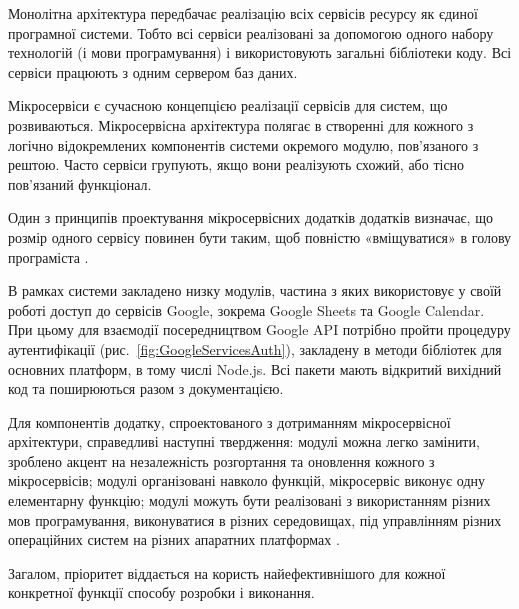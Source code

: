 \label{subsec:microservices}

Монолітна архітектура передбачає реалізацію всіх сервісів ресурсу як єдиної програмної системи. Тобто всі сервіси реалізовані за допомогою одного набору технологій (і мови програмування) і використовують загальні бібліотеки коду. Всі сервіси працюють з одним сервером баз даних.

Мікросервіси є сучасною концепцією реалізації сервісів для систем, що розвиваються. Мікросервісна архітектура полягає в створенні для кожного з логічно відокремлених компонентів системи окремого модулю, пов'язаного з рештою. Часто сервіси групують, якщо вони реалізують схожий, або тісно пов'язаний функціонал.  

Один з принципів проектування мікросервісних додатків додатків визначає, що розмір одного сервісу повинен бути таким, щоб повністю «вміщуватися» в голову програміста \cite{приходченко2018обґрунтування}.

В рамках системи закладено низку модулів, частина з яких використовує у своїй роботі доступ до сервісів Google, зокрема Google Sheets та Google Calendar. При цьому для взаємодії посередництвом Google API потрібно пройти процедуру аутентифікації (рис.~\ref{fig:GoogleServicesAuth}), закладену в методи бібліотек для основних платформ, в тому числі Node.js. Всі пакети мають відкритий вихідний код та поширюються разом з документацією.


Для компонентів додатку, спроектованого з дотриманням мікросервісної архітектури, справедливі наступні твердження: модулі можна легко замінити, зроблено акцент на незалежність розгортання та оновлення кожного з мікросервісів; модулі організовані навколо функцій, мікросервіс виконує одну елементарну функцію; модулі можуть бути реалізовані з використанням різних мов програмування, виконуватися в різних середовищах, під управлінням різних операційних систем на різних апаратних платформах \cite[159]{кучер2018мікросервісна}.

Загалом, пріоритет віддається на користь найефективнішого для кожної конкретної функції способу розробки і виконання.

